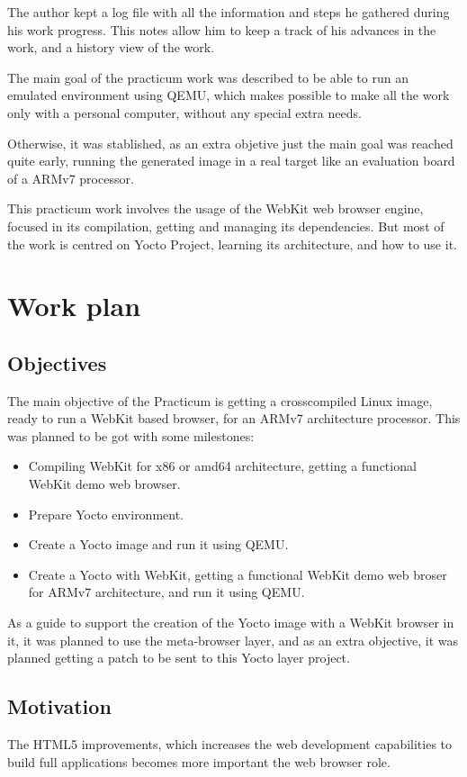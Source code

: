 \documentclass[a4paper,11pt,openany]{report}
\begin{document}
The author kept a log file with all the information and steps he gathered during his work progress. This notes allow him to keep a track of his advances in the work, and a history view of the work.

The main goal of the practicum work was described to be able to run an emulated environment using QEMU, which makes possible to make all the work only with a personal computer, without any special extra needs.

Otherwise, it was stablished, as an extra objetive just the main goal was reached quite early, running the generated image in a real target like an evaluation board of a ARMv7 processor.

This practicum work involves the usage of the WebKit web browser engine, focused in its compilation, getting and managing its dependencies. But most of the work is centred on Yocto Project, learning its architecture, and how to use it.

\chapter{Work plan}

\section{Objectives}
The main objective of the Practicum is getting a crosscompiled Linux image, ready to run a WebKit based browser, for an ARMv7 architecture processor. This was planned to be got with some milestones:

\begin{itemize}
\item Compiling WebKit for x86 or amd64 architecture, getting a functional WebKit demo web browser.
\item Prepare Yocto environment.
\item Create a Yocto image and run it using QEMU.
\item Create a Yocto with WebKit, getting a functional WebKit demo web broser for ARMv7 architecture, and run it using QEMU.
\end{itemize}

As a guide to support the creation of the Yocto image with a WebKit browser in it, it was planned to use the meta-browser\cite{meta-browser} layer, and as an extra objective, it was planned getting a patch to be sent to this Yocto layer project.

\section{Motivation}
The HTML5 improvements, which increases the web development capabilities to build full applications becomes more important the web browser role.
\end{document}
